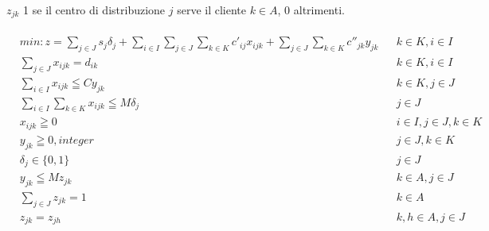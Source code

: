 \documentclass{article}
\begin{document}
$z_{jk}$ 1 se il centro di distribuzione $j$ serve il cliente $k \in A$, 0 altrimenti.\\
\\
\begin{align*}
&min: z= \displaystyle \sum_{j \in J}s_j\delta_j + \sum_{i \in I} \sum_{j \in J} \sum_{k \in K} c'_{ij}x_{ijk} + \displaystyle \sum_{j \in J} \sum_{k \in K}c''_{jk}y_{jk} & &k \in K, i \in I\\
		&\displaystyle \sum_{j \in J}x_{ijk} = d_{ik} & &k \in K, i \in I\\
    	&\displaystyle \sum_{i \in I}x_{ijk} \leqq Cy_{jk} & &k \in K, j \in J\\
    	&\displaystyle \sum_{i \in I} \sum_{k \in K} x_{ijk} \leqq M \delta_j & &j \in J \\
    	&x_{ijk} \geqq 0 & &i \in I, j \in J, k \in K\\
    	&y_{jk} \geqq 0, integer & &j \in J, k \in K\\
    	&\delta_{j} \in \{0,1\} & &j \in J\\
    	&y_{jk} \leqq Mz_{jk} & &k \in A, j \in J\\
    	&\displaystyle \sum_{j \in J} z_{jk} = 1 & &k \in A\\
    	&z_{jk} = z_{jh} & &k,h\in A, j \in J\\
\end{align*}

\newpage
\end{document}
